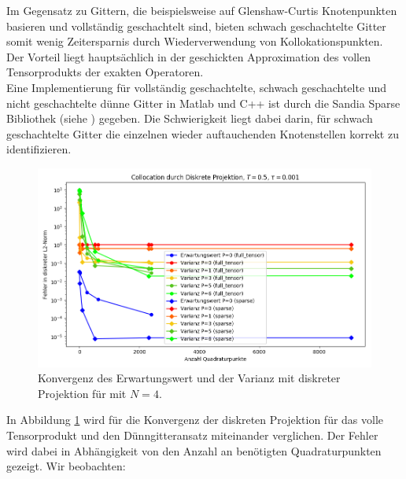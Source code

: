 Im Gegensatz zu Gittern, die beispielsweise auf Glenshaw-Curtis Knotenpunkten basieren und vollständig geschachtelt sind, bieten schwach geschachtelte Gitter somit wenig Zeitersparnis durch Wiederverwendung von Kollokationspunkten. Der Vorteil liegt hauptsächlich in der geschickten Approximation des vollen Tensorprodukts der exakten Operatoren.\\
Eine Implementierung für vollständig geschachtelte, schwach geschachtelte und nicht geschachtelte dünne Gitter in Matlab und C++ ist durch die Sandia Sparse Bibliothek (siehe \autocite{Sandia}) gegeben. Die Schwierigkeit liegt dabei darin, für schwach geschachtelte Gitter die einzelnen wieder auftauchenden Knotenstellen korrekt zu identifizieren.
\begin{figure}[!htb]
\includegraphics[width=\textwidth]{Figures/collocation_dp_trial8.png}
\caption{Konvergenz des Erwartungswert und der Varianz mit diskreter Projektion für  mit $N=4$.}
\label{fig:dp_trial8}
\end{figure}
In Abbildung \ref{fig:dp_trial8} wird für  die Konvergenz der diskreten Projektion für das volle Tensorprodukt und den Dünngitteransatz miteinander verglichen. Der Fehler wird dabei in Abhängigkeit von den Anzahl an benötigten Quadraturpunkten gezeigt. Wir beobachten:
